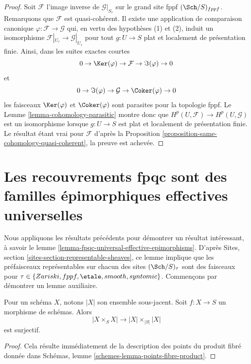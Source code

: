 \begin{proof}
Soit $\mathcal{F}$ l'image inverse de $\mathcal{G}|_{S_\tau}$ sur le grand
site fppf $(\Sch/S)_{fppf}$. Remarquons que $\mathcal{F}$ est quasi-cohérent.
Il existe une application de comparaison canonique
$\varphi : \mathcal{F} \to \mathcal{G}$ qui, en vertu des hypothèses (1) et
(2), induit un isomorphisme
$\mathcal{F}|_{U_\tau} \to \mathcal{G}|_{U_\tau}$ pour tout
$g : U \to S$ plat et localement de présentation finie.
Ainsi, dans les suites exactes courtes
$$
0 \to \Ker(\varphi) \to \mathcal{F} \to \Im(\varphi) \to 0
$$
et
$$
0 \to \Im(\varphi) \to \mathcal{G} \to \Coker(\varphi) \to 0
$$
les faisceaux $\Ker(\varphi)$ et $\Coker(\varphi)$ sont parasites pour la
topologie fppf. Le Lemme \ref{lemma-cohomology-parasitic} montre donc que
$H^p(U, \mathcal{F}) \to H^p(U, \mathcal{G})$ est un isomorphisme lorsque
$g : U \to S$ est plat et localement de présentation finie.
Le résultat étant vrai pour $\mathcal{F}$ d'après la
Proposition \ref{proposition-same-cohomology-quasi-coherent}, la preuve est
achevée.
\end{proof}













\section{Les recouvrements fpqc sont des familles épimorphiques effectives universelles}
\label{section-fpqc-universal-effective-epimorphisms}

\noindent
Nous appliquons les résultats précédents pour démontrer un résultat
intéressant, à savoir le lemme
\ref{lemma-fpqc-universal-effective-epimorphisms}.
D'après Sites, section \ref{sites-section-representable-sheaves},
ce lemme implique que les préfaisceaux représentables sur chacun des sites
$(\Sch/S)_\tau$ sont des faisceaux pour
$\tau \in \{Zariski, fppf, \etale, smooth, syntomic\}$. Commençons
par démontrer un lemme auxiliaire.

\begin{lemma}
\label{lemma-equiv-fibre-product}
Pour un schéma $X$, notons $|X|$ son ensemble sous-jacent.
Soit $f : X \to S$ un morphisme de schémas.
Alors
$$
|X \times_S X| \to |X| \times_{|S|} |X|
$$
est surjectif.
\end{lemma}

\begin{proof}
Cela résulte immédiatement de la description des points du produit
fibré donnée dans Schémas, lemme
\ref{schemes-lemma-points-fibre-product}.
\end{proof}


